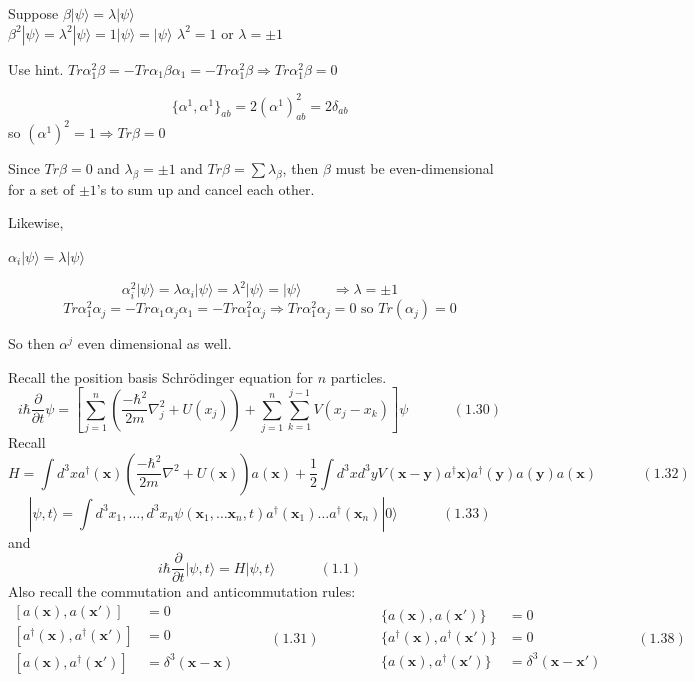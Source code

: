 \documentclass[twoside]{amsart}
\newcommand{\solutionhead}[1]
  {\smallskip
   \noindent{\large\bf Solution #1.}
   }
\begin{document}
\noindent Suppose $\beta | \psi \rangle = \lambda | \psi \rangle$ \\ 
\phantom{Suppose} $\beta^2 | \psi \rangle = \lambda^2 | \psi \rangle = 1 | \psi \rangle = | \psi \rangle$  $\lambda^2 = 1$ or $\lambda = \pm 1$  

Use hint.  $Tr{\alpha_1^2 \beta} = - Tr{ \alpha_1 \beta \alpha_1} = - Tr{ \alpha_1^2 \beta} \Longrightarrow Tr{ \alpha_1^2 \beta} = 0$

\[
\lbrace \alpha^1, \alpha^1 \rbrace_{ab} = 2 (\alpha^1 )^2_{ab} = 2 \delta_{ab}
\]
so $( \alpha^1)^2 = 1 \Longrightarrow Tr{ \beta } =0$

Since $Tr{\beta} = 0$ and $\lambda_{\beta} = \pm 1$ and $Tr{\beta} = \sum \lambda_{\beta}$, then $\beta$ must be even-dimensional for a set of $\pm 1$'s to sum up and cancel each other.

Likewise,

$\alpha_i | \psi \rangle = \lambda | \psi \rangle$

\[
\alpha_i^2 | \psi \rangle = \lambda \alpha_i | \psi \rangle = \lambda^2 | \psi \rangle = | \psi \rangle \quad  \quad \, \Longrightarrow \lambda = \pm 1 
\]
\[
Tr{ \alpha_1^2 \alpha_j} = - Tr{ \alpha_1 \alpha_j \alpha_1} = - Tr{ \alpha_1^2 \alpha_j } \Longrightarrow Tr{ \alpha_1^2 \alpha_j} =0 \text{ so } Tr{ (\alpha_j) } = 0
\]

So then $\alpha^j$ even dimensional as well.  


\solutionhead{1.2} Recall the position basis Schr\"{o}dinger equation for $n$ particles.  
\[
i \hbar \frac{ \partial }{ \partial t } \psi = \left[ \sum^n_{j=1} \left( \frac{ - \hbar^2}{ 2 m } \nabla_j^2 + U(x_j) \right) + \sum_{j=1}^n \sum_{k=1}^{j-1} V(x_j - x_k) \right] \psi \quad \quad \quad \, (1.30)
\]
Recall
\[
H = \int d^3x a^{\dag}(\mathbf{x}) \left( \frac{ - \hbar^2}{ 2m } \nabla^2 + U(\mathbf{x} ) \right) a(\mathbf{x}) + \frac{1}{2} \int d^3x d^3y V(\mathbf{x} - \mathbf{y})a^{\dag}\mathbf{x})a^{\dag}(\mathbf{y}) a(\mathbf{y})a(\mathbf{x}) \quad \quad \quad \, (1.32) 
\]
\[
|\psi, t \rangle = \int d^3x_1, \dots, d^3x_n \psi(\mathbf{x}_1, \dots \mathbf{x}_n,t) a^{\dag}(\mathbf{x}_1)\dots a^{\dag}(\mathbf{x}_n) |0 \rangle \quad \quad \quad \, (1.33) 
\]
and
\[
i \hbar \frac{ \partial}{ \partial t} | \psi, t \rangle = H | \psi, t \rangle \quad \quad \quad \, (1.1) 
\]
Also recall the commutation and anticommutation rules:
\[
\begin{aligned}
  \left[ a(\mathbf{x}), a(\mathbf{x}') \right] & = 0 \\ 
  [ a^{\dag}(\mathbf{x}), a^{\dag}(\mathbf{x}') ] & =0 \\ 
  [ a(\mathbf{x}), a^{\dag}(\mathbf{x}') ] & = \delta^3(\mathbf{x}- \mathbf{x}) 
\end{aligned} \quad \quad \, (1.31) \quad \quad \quad \quad \begin{aligned}
  \lbrace a(\mathbf{x}), a(\mathbf{x}') \rbrace & =0  \\
  \lbrace a^{\dag}(\mathbf{x}), a^{\dag}(\mathbf{x}') \rbrace & =0  \\
 \lbrace a(\mathbf{x}), a^{\dag}(\mathbf{x}') \rbrace & = \delta^3(\mathbf{x}- \mathbf{x}')
\end{aligned} \quad \quad \, (1.38)
\]
\end{document}
